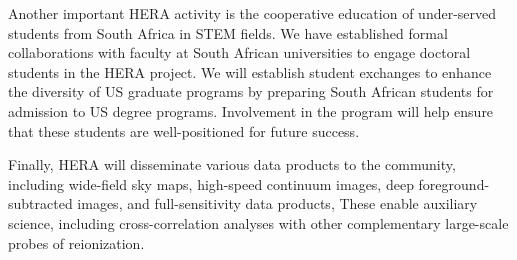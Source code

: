 \documentclass[preprint]{aastex}
\begin{document}
Another important HERA activity is the cooperative education of
under-served students from South Africa in STEM fields.
We have established formal collaborations
with faculty at South African universities to engage doctoral students in the HERA project.
We will establish student exchanges to enhance
the diversity of US graduate programs by preparing South African students for
admission to US degree programs.
Involvement in the program will help ensure that these students are well-positioned for
future success.

Finally, HERA will disseminate various data products to the community,
including wide-field sky maps, high-speed continuum images, deep
foreground-subtracted images, and full-sensitivity data products,  These enable
auxiliary science, including cross-correlation analyses with other 
complementary large-scale
probes of reionization.
\end{document}
